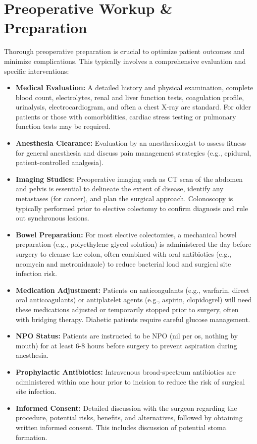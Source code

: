 \section*{Preoperative Workup \& Preparation}
Thorough preoperative preparation is crucial to optimize patient outcomes and minimize complications. This typically involves a comprehensive evaluation and specific interventions:
\begin{itemize}
  \item \textbf{Medical Evaluation:} A detailed history and physical examination, complete blood count, electrolytes, renal and liver function tests, coagulation profile, urinalysis, electrocardiogram, and often a chest X-ray are standard. For older patients or those with comorbidities, cardiac stress testing or pulmonary function tests may be required.
  \item \textbf{Anesthesia Clearance:} Evaluation by an anesthesiologist to assess fitness for general anesthesia and discuss pain management strategies (e.g., epidural, patient-controlled analgesia).
  \item \textbf{Imaging Studies:} Preoperative imaging such as CT scan of the abdomen and pelvis is essential to delineate the extent of disease, identify any metastases (for cancer), and plan the surgical approach. Colonoscopy is typically performed prior to elective colectomy to confirm diagnosis and rule out synchronous lesions.
  \item \textbf{Bowel Preparation:} For most elective colectomies, a mechanical bowel preparation (e.g., polyethylene glycol solution) is administered the day before surgery to cleanse the colon, often combined with oral antibiotics (e.g., neomycin and metronidazole) to reduce bacterial load and surgical site infection risk.
  \item \textbf{Medication Adjustment:} Patients on anticoagulants (e.g., warfarin, direct oral anticoagulants) or antiplatelet agents (e.g., aspirin, clopidogrel) will need these medications adjusted or temporarily stopped prior to surgery, often with bridging therapy. Diabetic patients require careful glucose management.
  \item \textbf{NPO Status:} Patients are instructed to be NPO (nil per os, nothing by mouth) for at least 6-8 hours before surgery to prevent aspiration during anesthesia.
  \item \textbf{Prophylactic Antibiotics:} Intravenous broad-spectrum antibiotics are administered within one hour prior to incision to reduce the risk of surgical site infection.
  \item \textbf{Informed Consent:} Detailed discussion with the surgeon regarding the procedure, potential risks, benefits, and alternatives, followed by obtaining written informed consent. This includes discussion of potential stoma formation.
\end{itemize}

